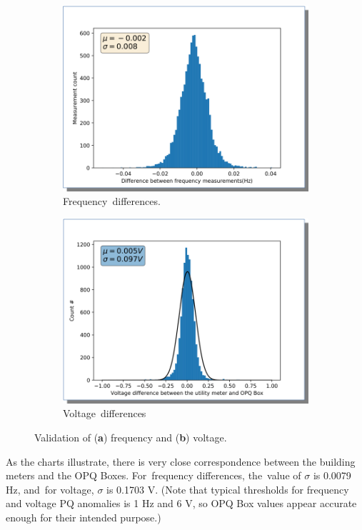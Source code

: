 \documentclass[energies,article,accept,moreauthors,pdftex]{Definitions/mdpi}
\begin{document}
\begin{figure}[H]
\centering
\begin{subfigure}{.5\textwidth}
\centering
\includegraphics[width=0.9\linewidth]{images/pilot/opqbox-frequency-validation.png}
\caption{Frequency~differences.}
\label{fig:opqbox-validation-1}
\end{subfigure}%
\begin{subfigure}{.5\textwidth}
\centering
\includegraphics[width=0.9\linewidth]{images/pilot/opqbox-voltage-validation.png}
\caption{Voltage~differences}
\label{fig:opqbox-validation-2}
\end{subfigure}
\caption{Validation of (\textbf{a}) frequency and (\textbf{b}) voltage.}
\label{fig:opqbox-f-v-validation}
\end{figure}

As the charts illustrate, there is very close correspondence between the building meters and the OPQ Boxes. For~frequency differences, the~value of $\sigma$ is 0.0079 Hz, and~for voltage, $\sigma$ is 0.1703 V. (Note that typical thresholds for frequency and voltage PQ anomalies is 1 Hz and 6 V, so OPQ Box values appear accurate enough for their intended purpose.)
\end{document}
